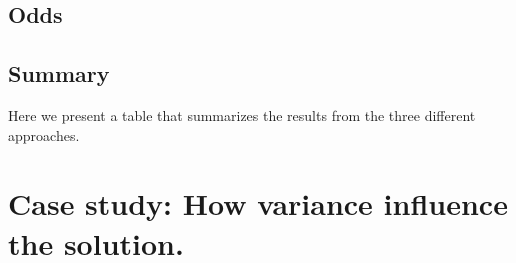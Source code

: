 \subsection{Odds}


\subsection{Summary}
Here we present a table that summarizes the results from the three different approaches. 

\section{Case study: How variance influence the solution.}

